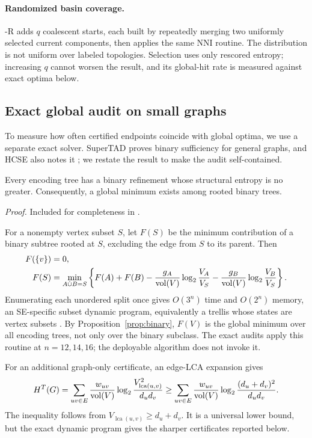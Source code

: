 \paragraph{Randomized basin coverage.}
\NEST-R adds $q$ coalescent starts, each built by repeatedly merging two
uniformly selected current components, then applies the same NNI routine. The
distribution is not uniform over labeled topologies. Selection uses only
rescored entropy; increasing $q$ cannot worsen the result, and its global-hit
rate is measured against exact optima below.

\subsection{Exact global audit on small graphs}
To measure how often certified endpoints coincide with global optima, we use a
separate exact solver. SuperTAD proves binary sufficiency for general graphs,
and HCSE also notes it \cite{zhang2021supertad,pan2025}; we restate the result
to make the audit self-contained.

\begin{proposition}\label{prop:binary}
Every encoding tree has a binary refinement whose structural entropy is no
greater. Consequently, a global minimum exists among rooted binary trees.
\end{proposition}
\emph{Proof.} Included for completeness in \proofdetails.

For a nonempty vertex subset $S$, let $F(S)$ be the minimum contribution of a
binary subtree rooted at $S$, excluding the edge from $S$ to its parent. Then
\begin{equation}
\begin{split}
F(\{v\})&=0,\\
F(S)&=\min_{A\dot\cup B=S}\left\{F(A)+F(B)
-\frac{g_A}{\operatorname{vol}(V)}\log_2\frac{V_A}{V_S}
-\frac{g_B}{\operatorname{vol}(V)}\log_2\frac{V_B}{V_S}\right\}.
\end{split}\label{eq:exact-dp}
\end{equation}
Enumerating each unordered split once gives $O(3^n)$ time and $O(2^n)$ memory,
an SE-specific subset dynamic program, equivalently a trellis whose states are
vertex subsets \cite{macaluso2021}.
By Proposition~\ref{prop:binary}, $F(V)$ is the global minimum over all encoding
trees, not only over the binary subclass. The exact audits apply this routine at
$n=12,14,16$; the deployable \NEST algorithm does not invoke it.

For an additional graph-only certificate, an edge-LCA expansion gives
\begin{equation}
H^T(G)=\sum_{uv\in E}\frac{w_{uv}}{\operatorname{vol}(V)}
\log_2\frac{V_{\operatorname{lca}(u,v)}^2}{d_ud_v}
\ge \sum_{uv\in E}\frac{w_{uv}}{\operatorname{vol}(V)}
\log_2\frac{(d_u+d_v)^2}{d_ud_v}.
\label{eq:edge-bound}
\end{equation}
The inequality follows from
$V_{\operatorname{lca}(u,v)}\ge d_u+d_v$. It is a universal lower bound, but
the exact dynamic program gives the sharper certificates reported below.
